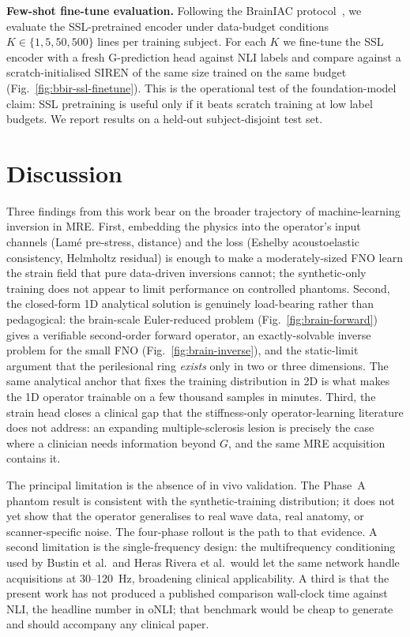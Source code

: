 \documentclass[11pt,letterpaper]{article}
\begin{document}
\textbf{Few-shot fine-tune evaluation.}
Following the BrainIAC protocol~\cite{tak2026brainiac}, we evaluate
the SSL-pretrained encoder under data-budget conditions
$K\!\in\!\{1, 5, 50, 500\}$ lines per training subject. For each $K$
we fine-tune the SSL encoder with a fresh G-prediction head against
NLI labels and compare against a scratch-initialised SIREN of the
same size trained on the same budget
(Fig.~\ref{fig:bbir-ssl-finetune}). This is the operational test
of the foundation-model claim: SSL pretraining is useful only if it
beats scratch training at low label budgets. We report results on a
held-out subject-disjoint test set.

\section*{Discussion}

Three findings from this work bear on the broader trajectory of
machine-learning inversion in MRE. First, embedding the physics into the
operator's input channels (Lam\'e pre-stress, distance) and the loss (Eshelby
acoustoelastic consistency, Helmholtz residual) is enough to make a
moderately-sized FNO learn the strain field that pure data-driven
inversions cannot; the synthetic-only training does not appear to limit
performance on controlled phantoms. Second, the closed-form 1D analytical
solution is genuinely load-bearing rather than pedagogical: the
brain-scale Euler-reduced problem
(Fig.~\ref{fig:brain-forward}) gives a verifiable second-order forward
operator, an exactly-solvable inverse problem for the small FNO
(Fig.~\ref{fig:brain-inverse}), and the static-limit argument that the
perilesional ring \emph{exists} only in two or three dimensions. The same
analytical anchor that fixes the training distribution in 2D is what
makes the 1D operator trainable on a few thousand samples in minutes.
Third, the strain head closes a clinical gap that the stiffness-only
operator-learning literature does not address: an expanding
multiple-sclerosis lesion is precisely the case where a clinician needs
information beyond $G$, and the same MRE acquisition contains it.

The principal limitation is the absence of in vivo validation. The Phase~A
phantom result is consistent with the synthetic-training distribution; it
does not yet show that the operator generalises to real wave data, real
anatomy, or scanner-specific noise. The four-phase rollout is the path to
that evidence. A second limitation is the single-frequency design: the
multifrequency conditioning used by Bustin et al.\ and Heras Rivera et al.\
would let the same network handle acquisitions at 30--120~Hz, broadening
clinical applicability. A third is that the present work has not produced
a published comparison wall-clock time against NLI, the headline number
in oNLI; that benchmark would be cheap to generate and should accompany
any clinical paper.
\end{document}
